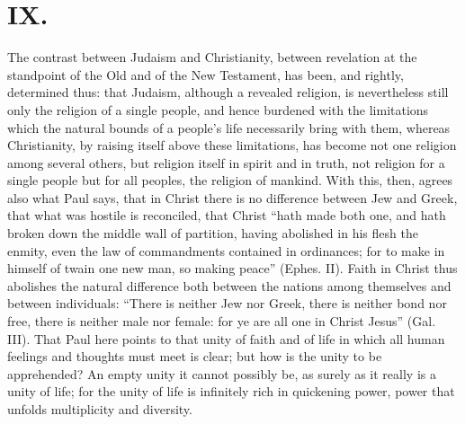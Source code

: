 \documentclass[12pt]{book}
\newcommand{\opage}[1]{\marginnote{\footnotesize\textit{[#1]}}}
\begin{document}
\chapter*{IX.}
\label{ch:ix}
\opage{135}\setcounter{footnote}{0}%
The contrast between Judaism and Christianity, between revelation at the
standpoint of the Old and of the New Testament, has been, and rightly,
determined thus: that Judaism, although a revealed religion, is
nevertheless still only the religion of a single people, and hence
burdened with the limitations which the natural bounds of a people's
life necessarily bring with them, whereas Christianity, by raising itself
above these limitations, has become not one religion among several
others, but religion itself in spirit and in truth, not religion for a
single people but for all peoples, the religion of mankind. With this,
then, agrees also what Paul says, that in Christ there is no difference
between Jew and Greek, that what was hostile is reconciled, that Christ
``hath made both one, and hath broken down the middle wall of partition,
having abolished in his flesh the enmity, even the law of commandments
contained in ordinances; for to make in himself of twain one new man, so
making peace'' (Ephes. II). Faith in Christ thus abolishes the natural
difference both between the nations among themselves and between
individuals: ``There is neither Jew nor Greek, there is neither bond nor
free, there is neither male nor female: for ye are all one in Christ
Jesus'' (Gal. III). That Paul here points to
\opage{136}\setcounter{footnote}{0}%
that unity of faith and of life in which all human feelings and thoughts
must meet is clear; but how is the unity to be apprehended? An empty
unity it cannot possibly be, as surely as it really is a unity of life;
for the unity of life is infinitely rich in quickening power, power that
unfolds multiplicity and diversity.
\end{document}
